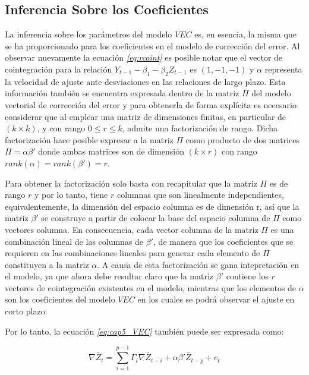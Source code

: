  \subsection{Inferencia Sobre los Coeficientes}
 


 La inferencia sobre los parámetros del modelo $VEC$ es, en esencia, la misma que se ha proporcionado para los coeficientes en el modelo de corrección del error. Al observar nuevamente la ecuación \textit{\ref{eq:rcoint}}  es posible notar que el vector de cointegración para la relación $Y_{t-1} - \beta_1 -\beta_2 Z_{t-1}$ es $(1, -1,-1)$ y $\alpha$ representa la velocidad de ajuste ante desviaciones en las relaciones de largo plazo. Esta información también se encuentra expresada dentro de la matriz $\Pi$ del modelo vectorial de corrección del error y para obtenerla de forma explícita es necesario considerar que al emplear una matriz de dimensiones finitas, en particular de $(k \times k)$, y con rango $0\leq r \leq k$, admite una factorización de rango. Dicha factorización hace posible expresar a la matriz $\Pi$ como producto de dos matrices $\Pi=\alpha\beta'$ donde ambas matrices son de dimensión $(k \times r)$ con rango $rank(\alpha)=rank(\beta')=r$.\bigskip 
 
 Para obtener la factorización solo basta con recapitular que la matriz $\Pi$ es de rango $r$ y por lo tanto, tiene $r$ columnas que son linealmente independientes, equivalentemente, la dimensión del espacio columna es de dimensión r, así que la matriz $\beta'$ se construye a partir de colocar la base del espacio columna de $\Pi$ como vectores columna. En consecuencia, cada vector columna de la matriz $\Pi$ es una combinación lineal  de las columnas de $\beta'$, de manera que los coeficientes que se requieren en las combinaciones lineales para generar cada elemento de $\Pi$ constituyen a la matriz $\alpha$. A causa de esta factorización se gana intepretación en el modelo, ya que ahora debe resultar claro que la matriz $\beta'$ contiene los $r$ vectores de cointegración existentes en el modelo, mientras que los elementos de $\alpha$ son los coeficientes del modelo $VEC$ en los cuales se podrá observar el ajuste en corto plazo.\bigskip 
 
 Por lo tanto, la ecuación  \textit{\ref{eq:cap5_VEC}} también puede ser expresada como:\bigskip 
 
    \begin{equation}  \label{eq:cap5_VECcon_alpha_y_beta}
\nabla \bar{Z}_t=\sum_{i=1}^{p-1}\Gamma_i\nabla\bar{Z}_{t-i} + \alpha\beta'\bar{Z}_{t-p}+  e_t
 \end{equation}
 
